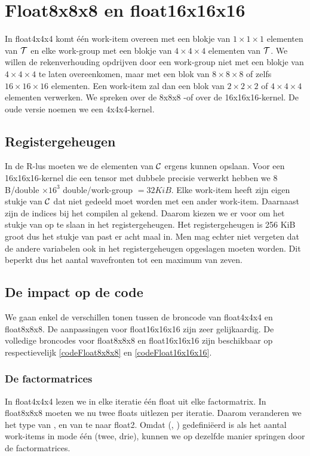 \section{Float8x8x8 en float16x16x16}
In float4x4x4 komt \'e\'en work-item overeen met een blokje van $1 \times 1 \times 1$ elementen van $\mathcal{T}$ en elke work-group met een blokje van $4 \times 4 \times 4$ elementen van $\mathcal{T}$. We willen de rekenverhouding opdrijven door een work-group niet met een blokje van $4 \times 4 \times 4$ te laten overeenkomen, maar met een blok van $8 \times 8 \times 8$ of zelfs $16 \times 16 \times 16$ elementen. Een work-item zal dan een blok van $2 \times 2 \times 2$ of $4 \times 4 \times 4$ elementen verwerken. We spreken over de 8x8x8 -of over de 16x16x16-kernel. De oude versie noemen we een 4x4x4-kernel.



\subsection{Registergeheugen}
In de R-lus moeten we de elementen van $\mathcal{C}$ ergens kunnen opslaan. Voor een 16x16x16-kernel die een tensor met dubbele precisie verwerkt hebben we $8$ B/double $\times 16^3$ double/work-group $= 32KiB$. Elke work-item heeft zijn eigen stukje van $\mathcal{C}$ dat niet gedeeld moet worden met een ander work-item. Daarnaast zijn de indices bij het compilen al gekend. Daarom kiezen we er voor om het stukje van \CC{} op te slaan in het registergeheugen. Het registergeheugen is 256 KiB groot dus het stukje van \CC{} past er acht maal in.  Men mag echter niet vergeten dat de andere variabelen ook in het registergeheugen opgeslagen moeten worden.  Dit beperkt dus het aantal wavefronten tot een maximum van zeven. 

\subsection{De impact op de code}
We gaan enkel de verschillen tonen tussen de broncode van float4x4x4 en float8x8x8. De aanpassingen voor float16x16x16 zijn zeer gelijkaardig. De volledige broncodes voor float8x8x8 en float16x16x16 zijn beschikbaar op respectievelijk \ref{codeFloat8x8x8} en \ref{codeFloat16x16x16}.
 
\subsubsection{De factormatrices}
In float4x4x4 lezen we in elke iteratie \'e\'en float uit elke factormatrix. In float8x8x8 moeten we nu twee floats uitlezen per iteratie. Daarom veranderen we het type van ,  en van  te naar float2. Omdat  (, ) gedefini\"eerd is als het aantal work-items in mode \'e\'en (twee, drie), kunnen we op dezelfde manier springen door de factormatrices.

